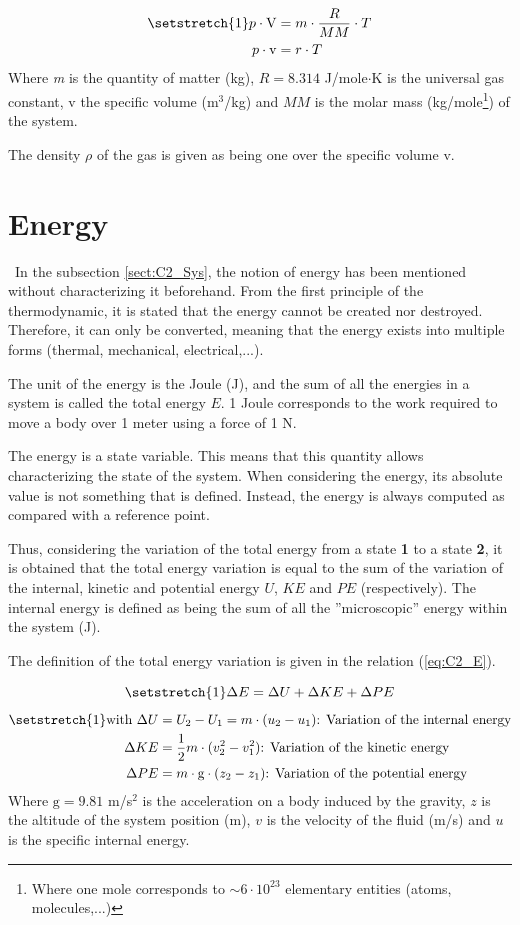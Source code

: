 \begin{align}
\setstretch{1}
p\cdot \mathrm{V} &= m\cdot\frac{R}{MM}\cdot T\nonumber\\
p\cdot \mathrm{v} &= r\cdot T\label{eq:C2_GP}    
\end{align}
Where \textit{m} is the quantity of matter (kg), $R=8.314$ J/mole$\cdot$K is the universal gas constant, $\mathrm{v}$ the specific volume (m$^3$/kg) and $MM$ is the molar mass (kg/mole\footnote{Where one mole corresponds to $\sim 6\cdot 10^{23}$ elementary entities (atoms, molecules,...)}) of the system. 

The density $\rho$ of the gas is given as being one over the specific volume $\mathrm{v}$.
\section{Energy}\label{sect:C2_Ener}
\quad\, In the subsection \ref{sect:C2_Sys}, the notion of energy has been mentioned without characterizing it beforehand. From the first principle of the thermodynamic, it is stated that the energy cannot be created nor destroyed. Therefore, it can only be converted, meaning that the energy exists into multiple forms (thermal, mechanical, electrical,...)\cite{thermoApp_2}. 

The unit of the energy is the Joule (J), and the sum of all the energies in a system is called the total energy $E$. 1 Joule corresponds to the work required to move a body over 1 meter using a force of 1 N.

The energy is a state variable. This means that this quantity allows characterizing the state of the system. When considering the energy, its absolute value is not something that is defined. Instead, the energy is always computed as compared with a reference point.

Thus, considering the variation of the total energy from a state \textbf{1} to a state \textbf{2}, it is obtained that the total energy variation is equal to the sum of the variation of the internal, kinetic and potential energy $U$, $KE$ and $PE$ (respectively). The internal energy is defined as being the  sum of all the ''microscopic'' energy within the system (J).  

The definition of the total energy variation is given in the relation (\ref{eq:C2_E}).

\begin{equation}
\setstretch{1}
    \Delta E = \Delta U + \Delta KE + \Delta PE \label{eq:C2_E}
\end{equation}
\begin{align*}
\setstretch{1}
    \text{with } \Delta U  &= U_2 - U_1 =  m\cdot(u_2 - u_1) \text{: Variation of the internal energy}\\
                 \Delta KE &= \frac{1}{2}m\cdot(v^2_2 - v^2_1)\text{: Variation of the kinetic energy}\\
                 \Delta PE &= m\cdot \text{g}\cdot(z_2 - z_1)\text{: Variation of the potential energy}
\end{align*} 
Where $\text{g}=9.81$ m/s$^2$ is the acceleration on a body induced by the gravity, $z$ is the altitude of the system position (m), $v$ is the velocity of the fluid (m/s) and $u$ is the specific internal energy.



